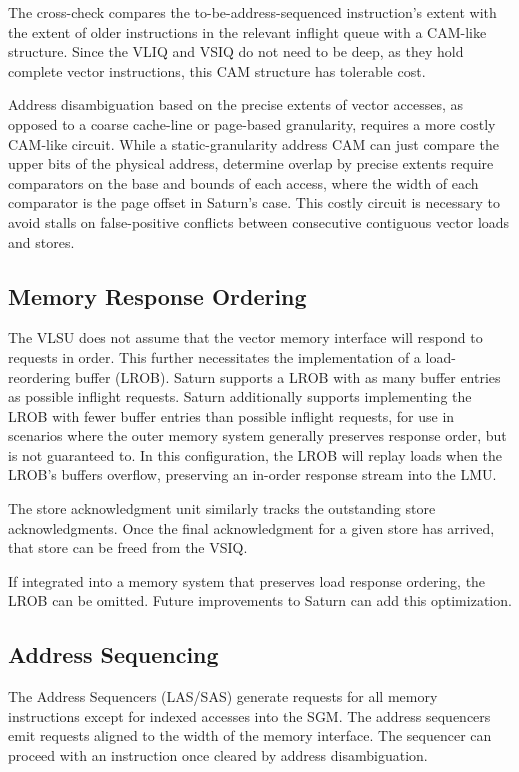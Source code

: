 The cross-check compares the to-be-address-sequenced instruction's extent with the extent of older instructions in the relevant inflight queue with a CAM-like structure.
Since the VLIQ and VSIQ do not need to be deep, as they hold complete vector instructions, this CAM structure has tolerable cost.

Address disambiguation based on the precise extents of vector accesses, as opposed to a coarse cache-line or page-based granularity, requires a more costly CAM-like circuit.
While a static-granularity address CAM can just compare the upper bits of the physical address, determine overlap by precise extents require comparators on the base and bounds of each access, where the width of each comparator is the page offset in Saturn's case.
This costly circuit is necessary to avoid stalls on false-positive conflicts between consecutive contiguous vector loads and stores.

\subsection{Memory Response Ordering}


The VLSU does not assume that the vector memory interface will respond to requests in order.
This further necessitates the implementation of a load-reordering buffer (LROB).
Saturn supports a LROB with as many buffer entries as possible inflight requests.
Saturn additionally supports implementing the LROB with fewer buffer entries than possible inflight requests, for use in scenarios where the outer memory system generally preserves response order, but is not guaranteed to.
In this configuration, the LROB will replay loads when the LROB's buffers overflow, preserving an in-order response stream into the LMU.

The store acknowledgment unit similarly tracks the outstanding store acknowledgments.
Once the final acknowledgment for a given store has arrived, that store can be freed from the VSIQ.

If integrated into a memory system that preserves load response ordering, the LROB can be omitted.
Future improvements to Saturn can add this optimization.

\subsection{Address Sequencing}
The Address Sequencers (LAS/SAS) generate requests for all memory instructions except for indexed accesses into the SGM.
The address sequencers emit requests aligned to the width of the memory interface.
The sequencer can proceed with an instruction once cleared by address disambiguation.

